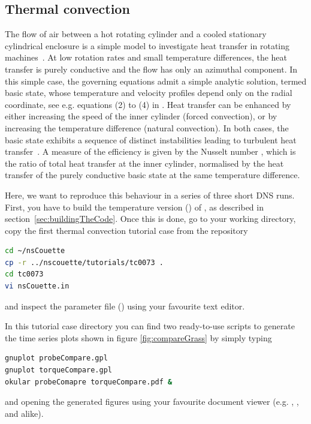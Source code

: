 \documentclass[a4paper, 11pt, DIV=11]{scrartcl}
\begin{document}
\subsection{Thermal convection}
\label{sec:tc0073}

The flow of air between a hot rotating cylinder and a cooled stationary
cylindrical enclosure is a simple model to investigate heat transfer in
rotating machines~\cite{Howey2012}. At low rotation rates and small temperature differences,
the heat transfer is purely conductive and the flow has only an azimuthal
component. In this simple case, the governing equations admit a simple
analytic solution, termed basic state, whose temperature and velocity
profiles depend only on the radial coordinate, see e.g. equations (2) to (4)
in \cite{Lopez2015}. Heat transfer can be enhanced by either increasing the
speed of the inner cylinder (forced convection), or by increasing the
temperature difference (natural convection). In both cases, the basic state exhibits
a sequence of distinct instabilities leading to turbulent heat transfer~\cite{Lopez2015}. A
measure of the efficiency is given by the Nusselt number \Nui, which is the
ratio of total heat transfer at the inner cylinder, normalised by the heat transfer
of the purely conductive basic state at the same temperature difference.
\par
Here, we want to reproduce this behaviour in a series of three short DNS runs.
First, you have to build the temperature version () of \nsc,
as described in section~\ref{sec:buildingTheCode}.
Once this is done, go to your working directory, copy the first thermal convection
tutorial case from the repository
\begin{lstlisting}[language=bash]
cd ~/nsCouette
cp -r ../nscouette/tutorials/tc0073 .
cd tc0073
vi nsCouette.in
\end{lstlisting}
and inspect the parameter file () using your favourite 
text editor.



In this tutorial case directory you can find two ready-to-use scripts to
generate the time series plots shown in figure \ref{fig:compareGrass} by
simply typing
\begin{lstlisting}[language=bash]
gnuplot probeCompare.gpl
gnuplot torqueCompare.gpl
okular probeComapre torqueCompare.pdf &
\end{lstlisting}
and opening the generated  figures using your favourite document 
viewer (e.g. , ,  and alike).
\end{document}
